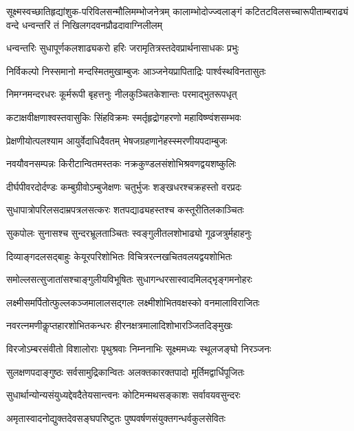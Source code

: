 

{सूक्ष्मस्वच्छातिहृद्यांशुक-परिविलसन्मौलिमम्भोजनेत्रम्}
{कालाम्भोदोज्ज्वलाङ्गं कटितटविलसच्चारूपीताम्बराढ्यं}
{वन्दे धन्वन्तरिं तं निखिलगदवनप्रौढदावाग्निलीलम्}

\twolineshloka
{धन्वन्तरिः सुधापूर्णकलशाढ्यकरो हरिः}
{जरामृतित्रस्तदेवप्रार्थनासाधकः प्रभुः}

\twolineshloka
{निर्विकल्पो निस्समानो मन्दस्मितमुखाम्बुजः}
{आञ्जनेयप्रापिताद्रिः पार्श्वस्थविनतासुतः}

\twolineshloka
{निमग्नमन्दरधरः कूर्मरूपी बृहत्तनुः}
{नीलकुञ्चितकेशान्तः परमाद्भुतरूपधृत्}

\twolineshloka
{कटाक्षवीक्षणाश्वस्तवासुकिः सिंहविक्रमः}
{स्मर्तृहृद्रोगहरणो महाविष्ण्वंशसम्भवः}

\twolineshloka
{प्रेक्षणीयोत्पलश्याम आयुर्वेदाधिदैवतम्}
{भेषजग्रहणानेहस्स्मरणीयपदाम्बुजः}

\twolineshloka
{नवयौवनसम्पन्नः किरीटान्वितमस्तकः}
{नक्रकुण्डलसंशोभिश्रवणद्वयशष्कुलिः}

\twolineshloka
{दीर्घपीवरदोर्दण्डः कम्बुग्रीवोऽम्बुजेक्षणः}
{चतुर्भुजः शङ्खधरश्चक्रहस्तो वरप्रदः}

\twolineshloka
{सुधापात्रोपरिलसदाम्रपत्रलसत्करः}
{शतपद्याढ्यहस्तश्च कस्तूरीतिलकाञ्चितः}

\twolineshloka
{सुकपोलः सुनासश्च सुन्दरभ्रूलताञ्चितः}
{स्वङ्गुलीतलशोभाढ्यो गूढजत्रुर्महाहनुः}

\twolineshloka
{दिव्याङ्गदलसद्बाहुः केयूरपरिशोभितः}
{विचित्ररत्नखचितवलयद्वयशोभितः}

\twolineshloka
{समोल्लसत्सुजातांसश्चाङ्गुलीयविभूषितः}
{सुधागन्धरसास्वादमिलद्भृङ्गमनोहरः}

\twolineshloka
{लक्ष्मीसमर्पितोत्फुल्लकञ्जमालालसद्गलः}
{लक्ष्मीशोभितवक्षस्को वनमालाविराजितः}

\twolineshloka
{नवरत्नमणीकॢप्तहारशोभितकन्धरः}
{हीरनक्षत्रमालादिशोभारञ्जितदिङ्मुखः}

\twolineshloka
{विरजोऽम्बरसंवीतो विशालोराः पृथुश्रवाः}
{निम्ननाभिः सूक्ष्ममध्यः स्थूलजङ्घो निरञ्जनः}

\twolineshloka
{सुलक्षणपदाङ्गुष्ठः सर्वसामुद्रिकान्वितः}
{अलक्तकारक्तपादो मूर्तिमद्वार्धिपूजितः}

\twolineshloka
{सुधार्थान्योन्यसंयुध्यद्देवदैतेयसान्त्वनः}
{कोटिमन्मथसङ्काशः सर्वावयवसुन्दरः}

\twolineshloka
{अमृतास्वादनोद्युक्तदेवसङ्घपरिष्टुतः}
{पुष्पवर्षणसंयुक्तगन्धर्वकुलसेवितः}

